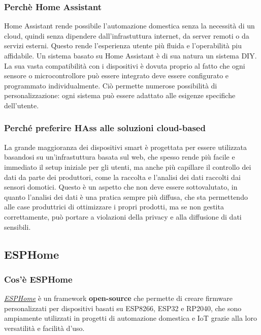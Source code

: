 \documentclass[11pt, a4paper]{article}
\begin{document}
\subsubsection{Perchè Home Assistant}
Home Assistant rende possibile l'automazione domestica senza la necessità di un cloud,
quindi senza dipendere dall'infrastuttura internet, da server remoti o da servizi esterni.
Questo rende l'esperienza utente più fluida e l'operabilità piu affidabile.
Un sistema basato su Home Assistant è di sua natura un sistema DIY. La sua vasta compatibilità
con i dispositivi è dovuta proprio al fatto che ogni sensore o microcontrollore può essere integrato
deve essere configurato e programmato individualmente. Ciò permette numerose possibilità di
personalizzazione: ogni sistema può essere adattato alle esigenze specifiche dell'utente.

\subsubsection{Perché preferire HAss alle soluzioni cloud-based}
La grande maggioranza dei dispositivi smart è progettata per essere utilizzata basandosi su
un'infrastuttura basata sul web, che spesso rende più facile e immediato il setup iniziale per gli utenti,
ma anche più capillare il controllo dei dati da parte dei produttori, come la raccolta e l'analisi dei dati
raccolti dai sensori domotici. Questo è un aspetto che non deve essere sottovalutato, in quanto
l'analisi dei dati è una pratica sempre più diffusa, che sta permettendo alle case produttrici di
ottimizzare i propri prodotti, ma se non gestita correttamente, può portare a violazioni della privacy
e alla diffusione di dati sensibili.

\subsection{ESPHome}

\subsubsection{Cos'è ESPHome}
\href{https://esphome.io}{\textit{ESPHome}} è un framework \textbf{open-source} che permette di creare firmware personalizzati per dispositivi basati su ESP8266, ESP32 e RP2040,
che sono ampiamente utilizzati in progetti di automazione domestica e IoT grazie alla loro versatilità e facilità d'uso.
\end{document}
